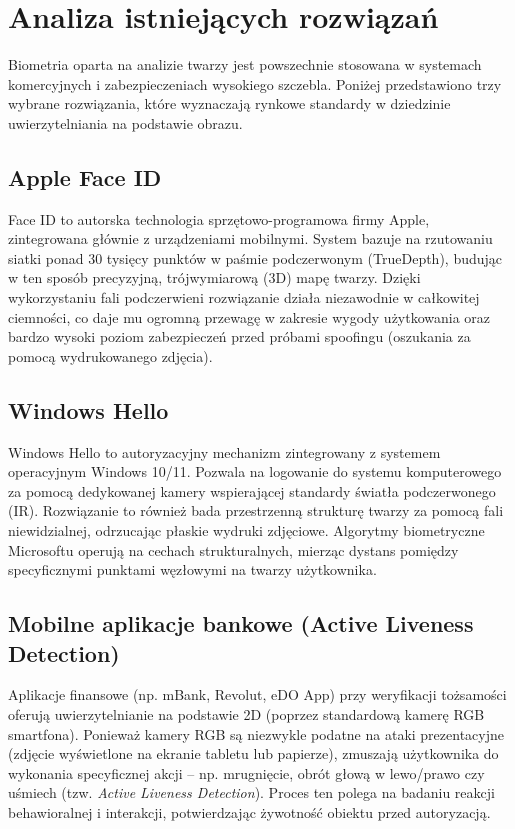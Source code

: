 \chapter{Analiza istniejących rozwiązań}

Biometria oparta na analizie twarzy jest powszechnie stosowana w systemach komercyjnych i zabezpieczeniach wysokiego szczebla. Poniżej przedstawiono trzy wybrane rozwiązania, które wyznaczają rynkowe standardy w dziedzinie uwierzytelniania na podstawie obrazu.

\section{Apple Face ID}
Face ID to autorska technologia sprzętowo-programowa firmy Apple, zintegrowana głównie z urządzeniami mobilnymi. System bazuje na rzutowaniu siatki ponad 30 tysięcy punktów w paśmie podczerwonym (TrueDepth), budując w ten sposób precyzyjną, trójwymiarową (3D) mapę twarzy. Dzięki wykorzystaniu fali podczerwieni rozwiązanie działa niezawodnie w całkowitej ciemności, co daje mu ogromną przewagę w zakresie wygody użytkowania oraz bardzo wysoki poziom zabezpieczeń przed próbami spoofingu (oszukania za pomocą wydrukowanego zdjęcia).

\section{Windows Hello}
Windows Hello to autoryzacyjny mechanizm zintegrowany z systemem operacyjnym Windows 10/11. Pozwala na logowanie do systemu komputerowego za pomocą dedykowanej kamery wspierającej standardy światła podczerwonego (IR). Rozwiązanie to również bada przestrzenną strukturę twarzy za pomocą fali niewidzialnej, odrzucając płaskie wydruki zdjęciowe. Algorytmy biometryczne Microsoftu operują na cechach strukturalnych, mierząc dystans pomiędzy specyficznymi punktami węzłowymi na twarzy użytkownika.

\section{Mobilne aplikacje bankowe (Active Liveness Detection)}
Aplikacje finansowe (np. mBank, Revolut, eDO App) przy weryfikacji tożsamości oferują uwierzytelnianie na podstawie 2D (poprzez standardową kamerę RGB smartfona). Ponieważ kamery RGB są niezwykle podatne na ataki prezentacyjne (zdjęcie wyświetlone na ekranie tabletu lub papierze), zmuszają użytkownika do wykonania specyficznej akcji -- np. mrugnięcie, obrót głową w lewo/prawo czy uśmiech (tzw. \textit{Active Liveness Detection}). Proces ten polega na badaniu reakcji behawioralnej i interakcji, potwierdzając żywotność obiektu przed autoryzacją.

